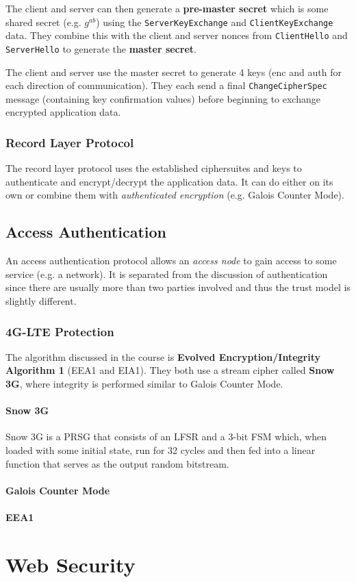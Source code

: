 \documentclass[11pt]{report}
\begin{document}
The client and server can then generate a \textbf{pre-master secret} which is some shared secret (e.g. $g^{ab}$) using the \texttt{ServerKeyExchange} and \texttt{ClientKeyExchange} data. They combine this with the client and server nonces from \texttt{ClientHello} and \texttt{ServerHello} to generate the \textbf{master secret}.

The client and server use the master secret to generate 4 keys (enc and auth for each direction of communication). They each send a final \texttt{ChangeCipherSpec} message (containing key confirmation values) before beginning to exchange encrypted application data.

\subsection{Record Layer Protocol}
The record layer protocol uses the established ciphersuites and keys to authenticate and encrypt/decrypt the application data. It can do either on its own or combine them with \textit{authenticated encryption} (e.g. Galois Counter Mode).

\section{Access Authentication}
An access authentication protocol allows an \textit{access node} to gain access to some service (e.g. a network). It is separated from the discussion of authentication since there are usually more than two parties involved and thus the trust model is slightly different.

\subsection{4G-LTE Protection}
The algorithm discussed in the course is \textbf{Evolved Encryption/Integrity Algorithm 1} (EEA1 and EIA1). They both use a stream cipher called \textbf{Snow 3G}, where integrity is performed similar to Galois Counter Mode.

\subsubsection{Snow 3G}
Snow 3G is a PRSG that consists of an LFSR and a 3-bit FSM which, when loaded with some initial state, run for 32 cycles and then fed into a linear function that serves as the output random bitstream.

\subsubsection{Galois Counter Mode}

\subsubsection{EEA1}

\chapter{Web Security}
\end{document}
